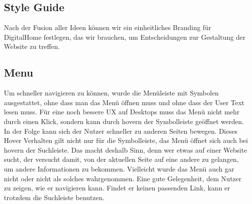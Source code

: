 \subsection{Style Guide}
Nach der Fusion aller Ideen können wir ein einheitliches Branding für DigitalHome festlegen, das wir brauchen, um Entscheidungen zur Gestaltung der Website zu treffen.
\subsection{Menu}
Um schneller navigieren zu können, wurde die Menüleiste mit Symbolen ausgestattet, ohne dass man das Menü öffnen muss und ohne dass der User Text lesen muss. Für eine noch bessere UX auf Desktops muss das Menü nicht mehr durch einen Klick, sondern kann durch hovern der Symbolleiste geöffnet werden. In der Folge kann sich der Nutzer schneller zu anderen Seiten bewegen. Dieses Hover Verhalten gilt nicht nur für die Symbolleiste, das Menü öffnet sich auch bei hovern der Suchleiste. Das macht deshalb Sinn, denn wer etwas auf einer Website sucht, der versucht damit, von der aktuellen Seite auf eine andere zu gelangen, um andere Informationen zu bekommen. Vielleicht wurde das Menü auch gar nicht oder nicht als solches wahrgenommen. Eine gute Gelegenheit, dem Nutzer zu zeigen, wie er navigieren kann. Findet er keinen passenden Link, kann er trotzdem die Suchleiste benutzen.

